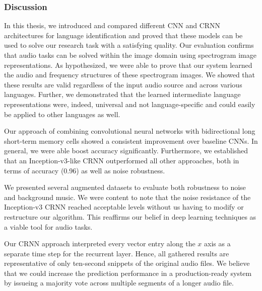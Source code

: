 \subsubsection{Discussion}
\label{sec:comparison}
In this thesis, we introduced and compared different CNN and CRNN architectures for language identification and proved that these models can be used to solve our research task with a satisfying quality. Our evaluation confirms that audio tasks can be solved within the image domain using spectrogram image representations. As hypothesized, we were able to prove that our system learned the audio and frequency structures of these spectrogram images. We showed that these results are valid regardless of the input audio source and across various languages. Further, we demonstrated that the learned intermediate language representations were, indeed, universal and not language-specific and could easily be applied to other languages as well.

Our approach of combining convolutional neural networks with bidirectional long short-term memory cells showed a consistent improvement over baseline CNNs. In general, we were able boost accuracy significantly. Furthermore, we established that an Inception-v3-like CRNN outperformed all other approaches, both in terms of accuracy (\num{0.96}) as well as noise robustness.

We presented several augmented datasets to evaluate both robustness to noise and background music. We were content to note that the noise resistance of the Inception-v3 CRNN reached acceptable levels without us having to modify or restructure our algorithm. This reaffirms our belief in deep learning techniques as a viable tool for audio tasks.

Our CRNN approach interpreted every vector entry along the $x$ axis as a separate time step for the recurrent layer. Hence, all gathered results are representative of only ten-second snippets of the original audio files. We believe that we could increase the prediction performance in a production-ready system by issueing a majority vote across multiple segments of a longer audio file.

